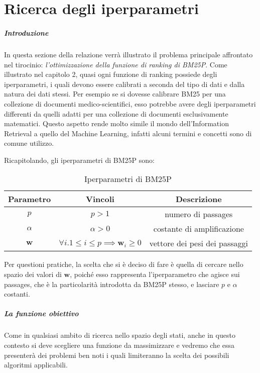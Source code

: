 \chapter{Ricerca degli iperparametri}

\paragraph{Introduzione}
In questa sezione della relazione verrà illustrato il problema principale affrontato nel tirocinio:
\textit{l'ottimizzazione della funzione di ranking di BM25P}.
Come illustrato nel capitolo 2, quasi ogni funzione di ranking possiede degli iperparametri, i quali
devono essere calibrati a seconda del tipo di dati e dalla natura dei dati stessi.
Per esempio se si dovesse calibrare BM25 per una collezione
di documenti medico-scientifici, esso potrebbe avere degli iperparametri
differenti da quelli adatti per una collezione di documenti esclusivamente matematici.
Questo aspetto rende molto simile il mondo dell'Information Retrieval a quello del Machine Learning,
infatti alcuni termini e concetti sono di comune utilizzo.


Ricapitolando, gli iperparametri di BM25P sono:
\begin{table}[h!]
	\centering
	\begin{tabular}{|c|c|c|}
		\hline
		Parametro & Vincoli & Descrizione \\
		\hline
		$p$ & $p>1$ & numero di passages \\
		\hline
		$\alpha$ & $\alpha > 0$ & costante di amplificazione \\
		\hline
		$\boldsymbol{w}$ & $\forall{i.1 \leq i \leq p}\implies \boldsymbol{w}_i \geq 0$ & vettore dei pesi dei passaggi \\
		\hline
	\end{tabular}
\caption{Iperparametri di BM25P}
\end{table}

Per questioni pratiche, la scelta che si è deciso di fare è quella di cercare
nello spazio dei valori di $\boldsymbol{w}$, poiché esso rappresenta l'iperparametro
che agisce sui passages, che è la particolarità introdotta da BM25P stesso, e lasciare
$p$ e $\alpha$ costanti.

\paragraph{La funzione obiettivo}

Come in qualsiasi ambito di ricerca nello spazio degli stati, anche in questo contesto
si deve scegliere una funzione da massimizzare e vedremo che essa presenterà dei problemi ben
noti i quali limiteranno la scelta dei possibili algoritmi applicabili.

